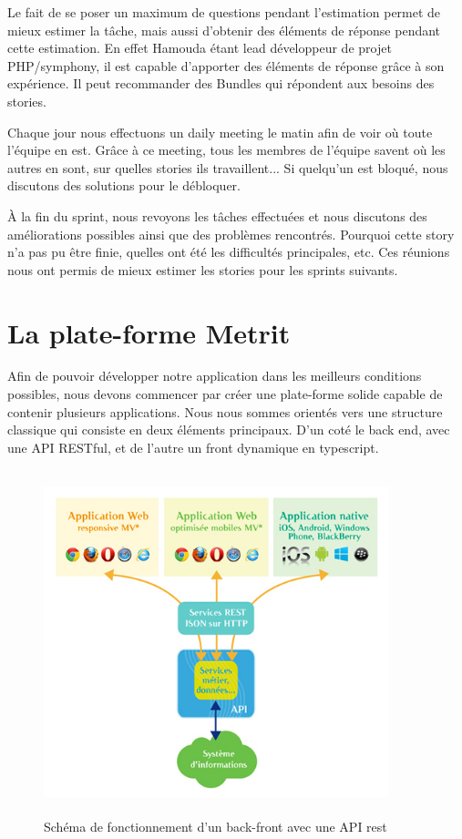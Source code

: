 \documentclass[12pt, twoside, openright]{report}
\begin{document}
Le fait de se poser un maximum de questions pendant l'estimation permet de mieux estimer la tâche, mais aussi d'obtenir des éléments de réponse pendant cette estimation. En effet Hamouda étant lead développeur de projet PHP/symphony, il est capable d'apporter des éléments de réponse grâce à son expérience. Il peut recommander des Bundles qui répondent aux besoins des stories. 

Chaque jour nous effectuons un daily meeting le matin afin de voir où toute l'équipe en est. Grâce à ce meeting, tous les membres de l'équipe savent où les autres en sont, sur quelles stories ils travaillent... Si quelqu'un est bloqué, nous discutons des solutions pour le débloquer. 

À la fin du sprint, nous revoyons les tâches effectuées et nous discutons des améliorations possibles ainsi que des problèmes rencontrés. Pourquoi cette story n'a pas pu être finie, quelles ont été les difficultés principales, etc. Ces réunions nous ont permis de mieux estimer les stories pour les sprints suivants. 

\section{La plate-forme Metrit}

Afin de pouvoir développer notre application dans les meilleurs conditions possibles, nous devons commencer par créer une plate-forme solide capable de contenir plusieurs applications. Nous nous sommes orientés vers une structure classique qui consiste en deux éléments principaux. D'un coté le back end, avec une API RESTful, et de l'autre un front dynamique en typescript.

\begin{figure}[h]
\centering
\includegraphics[width=10cm,height=10cm]{img/front-back.jpg}\caption{Schéma de fonctionnement d'un back-front avec une API rest}
\end{figure}
\end{document}
